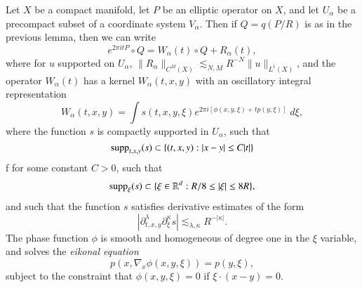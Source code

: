 \begin{lemma} \label{lemma:WaveOscillatoryLemmaddw}
  Let $X$ be a compact manifold, let $P$ be an elliptic operator on $X$, and let $U_\alpha$ be a precompact subset of a coordinate system $V_\alpha$. Then if $Q = q(P/R)$ is as in the previous lemma, then we can write
  \[ e^{2 \pi i t P} \circ Q = W_\alpha(t) \circ Q + R_\alpha(t), \]
  where for $u$ supported on $U_\alpha$, $\| R_\alpha \|_{C^M(X)} \lesssim_{N,M} R^{-N} \| u \|_{L^1(X)}$, and the operator $W_\alpha(t)$ has a kernel $W_\alpha(t,x,y)$ with an oscillatory integral representation
        \[ W_\alpha(t,x,y) = \int s(t,x,y,\xi) e^{2 \pi i [ \phi(x,y,\xi) + t p(y,\xi) ]}\; d\xi, \]
        where the function $s$ is compactly supported in $U_\alpha$, such that
        \[ \operatorname{\text{supp}}_{t,x,y}(s) \subset \{ (t,x,y) : |x - y| \leq C |t| \} \]f
        for some constant $C > 0$, such that
        \[ \operatorname{\text{supp}}_\xi(s) \subset \{ \xi \in \operatorname{\mathbb{R}}^d : R/8 \leq |\xi| \leq 8R \}, \]
        and such that the function $s$ satisfies derivative estimates of the form
        \[ | \partial_{t,x,y}^\lambda \partial_\xi^\kappa s | \lesssim_{\lambda, \kappa} R^{- |\kappa|}. \]
        The phase function $\phi$ is smooth and homogeneous of degree one in the $\xi$ variable, and solves the \emph{eikonal equation}
        \[ p \left( x, \nabla_x \phi(x,y,\xi) \right) = p(y,\xi), \]
        subject to the constraint that $\phi(x,y,\xi) = 0$ if $\xi \cdot (x - y) = 0$.
\end{lemma}
